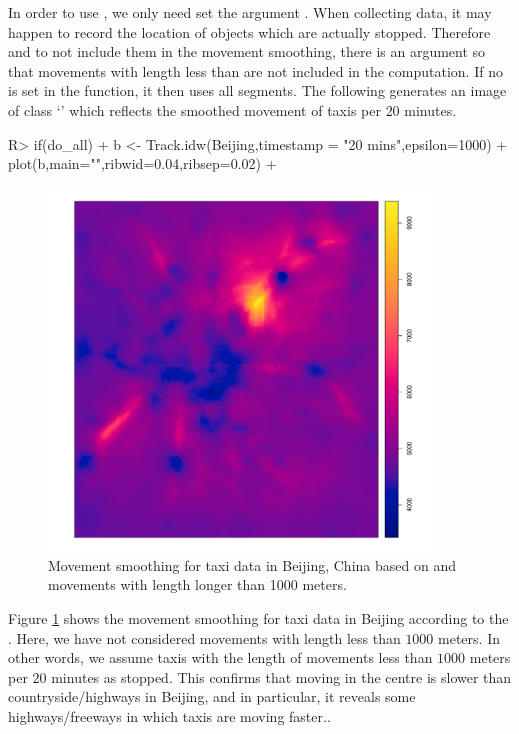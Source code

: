 \documentclass[article]{jss}
\newcommand{\class}[1]{`\code{#1}'}
\begin{document}
  In order to use , we only need set the argument . When collecting data, it may happen to record the location of objects which are actually stopped. Therefore and to not include them in the movement smoothing, there is an argument  so that movements with length less than  are not included in the computation. If no  is set in the function, it then uses all segments. 
  The following  generates an image of class \class{im} which reflects the smoothed movement of taxis per $20$ minutes.
\begin{Schunk}
\begin{Sinput}
R> if(do_all){
+  b <- Track.idw(Beijing,timestamp = "20 mins",epsilon=1000)
+  plot(b,main="",ribwid=0.04,ribsep=0.02)
+  }
\end{Sinput}
\end{Schunk}

  \begin{figure}[!h]
  \centering
  \includegraphics[width = 4in]{idw}
  \caption{Movement smoothing for taxi data in Beijing, China based on  and movements with length longer than 1000 meters.}
  \label{idwBeijing}
  \end{figure}
  Figure \ref{idwBeijing} shows the movement smoothing for taxi data in Beijing according to the . Here, we have not considered movements with length less than $1000$ meters. In other words, we assume taxis with the length of movements less than $1000$ meters per $20$ minutes as stopped. This confirms that moving in the centre is slower than countryside/highways in Beijing, and in particular, it reveals some highways/freeways in which taxis are moving faster..
\end{document}
